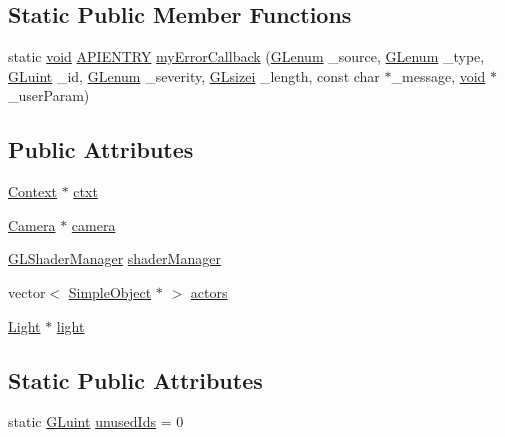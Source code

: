 \subsection*{Static Public Member Functions}
\begin{DoxyCompactItemize}
\item 
static \hyperlink{_s_d_l__opengl_8h_a3db05964a3cc4410f35b7ea2b7eb850d}{void} \hyperlink{_s_d_l__opengl_8h_a428a91acf2c2439dc1a257708ee1f805}{A\-P\-I\-E\-N\-T\-R\-Y} \hyperlink{class_renderer_a038fbeec8dbb94117caa42668df7e5a6}{my\-Error\-Callback} (\hyperlink{_g_l_e_w_2glew_8h_a5d5233918a454ad3975c620a69ac5f0b}{G\-Lenum} \-\_\-source, \hyperlink{_g_l_e_w_2glew_8h_a5d5233918a454ad3975c620a69ac5f0b}{G\-Lenum} \-\_\-type, \hyperlink{_g_l_e_w_2glew_8h_a68c4714e43d8e827d80759f9cb864f3c}{G\-Luint} \-\_\-id, \hyperlink{_g_l_e_w_2glew_8h_a5d5233918a454ad3975c620a69ac5f0b}{G\-Lenum} \-\_\-severity, \hyperlink{_g_l_e_w_2glew_8h_a554225105c98042437ff21db4732908f}{G\-Lsizei} \-\_\-length, const char $\ast$\-\_\-message, \hyperlink{_s_d_l__opengl_8h_a3db05964a3cc4410f35b7ea2b7eb850d}{void} $\ast$\-\_\-user\-Param)
\end{DoxyCompactItemize}
\subsection*{Public Attributes}
\begin{DoxyCompactItemize}
\item 
\hyperlink{class_context}{Context} $\ast$ \hyperlink{class_renderer_aea515600e7513ae80843e009e5148f53}{ctxt}
\item 
\hyperlink{class_camera}{Camera} $\ast$ \hyperlink{class_renderer_af7ed774ad36cde6ec727ccc0bd5d0b6f}{camera}
\item 
\hyperlink{class_g_l_shader_manager}{G\-L\-Shader\-Manager} \hyperlink{class_renderer_a8cde2a34816fc71455871bc0e3b18853}{shader\-Manager}
\item 
vector$<$ \hyperlink{class_simple_object}{Simple\-Object} $\ast$ $>$ \hyperlink{class_renderer_a0720c526eb9be11876d4849af801eb91}{actors}
\item 
\hyperlink{class_light}{Light} $\ast$ \hyperlink{class_renderer_adade11a742565582736c8058041803e5}{light}
\end{DoxyCompactItemize}
\subsection*{Static Public Attributes}
\begin{DoxyCompactItemize}
\item 
static \hyperlink{_g_l_e_w_2glew_8h_a68c4714e43d8e827d80759f9cb864f3c}{G\-Luint} \hyperlink{class_renderer_a4182a30e4246da1112f631b3d850ac14}{unused\-Ids} = 0
\end{DoxyCompactItemize}


